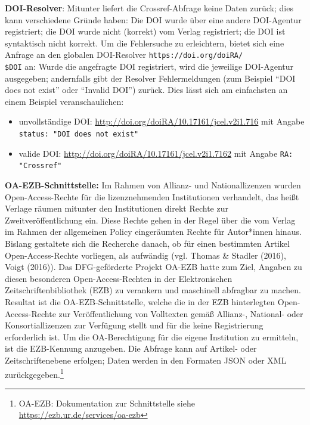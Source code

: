 \documentclass[a4paper,
fontsize=11pt,
oneside,
numbers=noperiodatend,
parskip=half-,
bibliography=totoc,
final
]{scrartcl}
\begin{document}
\textbf{DOI-Resolver}: Mitunter liefert die Crossref-Abfrage keine Daten
zurück; dies kann verschiedene Gründe haben: Die DOI wurde über eine
andere DOI-Agentur registriert; die DOI wurde nicht (korrekt) vom Verlag
registriert; die DOI ist syntaktisch nicht korrekt. Um die Fehlersuche
zu erleichtern, bietet sich eine Anfrage an den globalen DOI-Resolver
\texttt{https://doi.org/doiRA/\\\$DOI} an: Wurde die angefragte DOI registriert,
wird die jeweilige DOI-Agentur ausgegeben; andernfalls gibt der Resolver
Fehlermeldungen (zum Beispiel \enquote{DOI does not exist} oder
\enquote{Invalid DOI}) zurück. Dies lässt sich am einfachsten an einem
Beispiel veranschaulichen:

\begin{itemize}
\item
  unvollständige DOI: \url{http://doi.org/doiRA/10.17161/jcel.v2i1.716}
  mit Angabe \texttt{status: "DOI does not exist"}
\item
  valide DOI: \url{http://doi.org/doiRA/10.17161/jcel.v2i1.7162} mit
  Angabe \texttt{RA: "Crossref"}
\end{itemize}

\textbf{OA-EZB-Schnittstelle:} Im Rahmen von Allianz- und
Nationallizenzen wurden Open-Access-Rechte für die lizenznehmenden
Institutionen verhandelt, das heißt Verlage räumen mitunter den
Institutionen direkt Rechte zur Zweitveröffentlichung ein. Diese Rechte
gehen in der Regel über die vom Verlag im Rahmen der allgemeinen Policy
eingeräumten Rechte für Autor*innen hinaus. Bislang gestaltete sich die
Recherche danach, ob für einen bestimmten Artikel Open-Access-Rechte
vorliegen, als aufwändig (vgl. Thomas \& Stadler (2016), Voigt (2016)).
Das DFG-geförderte Projekt OA-EZB hatte zum Ziel, Angaben zu diesen
besonderen Open-Access-Rechten in der Elektronischen
Zeitschriftenbibliothek (EZB) zu verankern und maschinell abfragbar zu
machen. Resultat ist die OA-EZB-Schnittstelle, welche die in der EZB
hinterlegten Open-Access-Rechte zur Veröffentlichung von Volltexten
gemäß Allianz-, National- oder Konsortiallizenzen zur Verfügung stellt
und für die keine Registrierung erforderlich ist. Um die OA-Berechtigung
für die eigene Institution zu ermitteln, ist die EZB-Kennung anzugeben.
Die Abfrage kann auf Artikel- oder Zeitschriftenebene erfolgen; Daten
werden in den Formaten JSON oder XML zurückgegeben.\footnote{OA-EZB:
  Dokumentation zur Schnittstelle siehe
  \url{https://ezb.ur.de/services/oa-ezb}}
\end{document}
